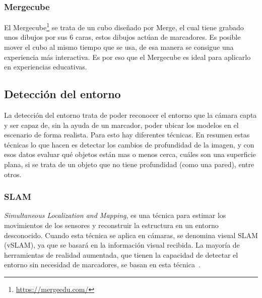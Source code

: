 







\subsubsection{Mergecube}\label{section:mergecube}

El Mergecube\footnote{\url{https://mergeedu.com/}} se trata de un cubo diseñado por Merge, el cual tiene grabado unos dibujos por sus 6 caras, estos dibujos actúan de marcadores. Es posible mover el cubo al mismo tiempo que se usa, de esa manera se consigue una experiencia más interactiva. Es por eso que el Mergecube es ideal para aplicarlo en experiencias educativas.


\subsection{Detección del entorno}

La detección del entorno trata de poder reconocer el entorno que la cámara capta y ser capaz de, sin la ayuda de un marcador, poder ubicar los modelos en el escenario de forma realista.
Para esto hay diferentes técnicas. En resumen estas técnicas lo que hacen es detectar los cambios de profundidad de la imagen, y con esos datos evaluar qué objetos están mas o menos cerca, cuáles son una superficie plana, si se trata de un objeto que no tiene profundidad (como una pared), entre otros.

\subsubsection{SLAM}

\textit{Simultaneous Localization and Mapping}, es una técnica para estimar los movimientos de los sensores y reconstruir la estructura en un entorno desconocido. Cuando esta técnica se aplica en cámaras, se denomina visual SLAM (vSLAM), ya que se basará en la información visual recibida.
La mayoría de herramientas de realidad aumentada, que tienen la capacidad de detectar el entorno sin necesidad de marcadores, se basan en esta técnica~\cite{taketomi2017visual}.

